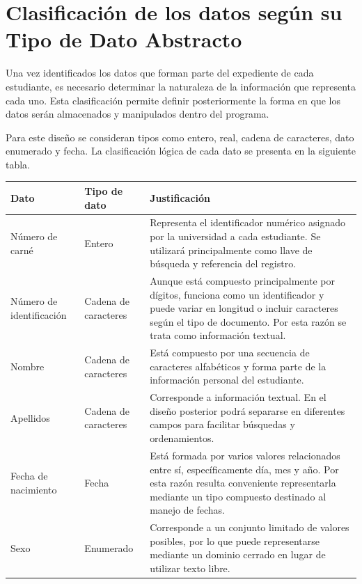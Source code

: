 \section{Clasificación de los datos según su Tipo de Dato Abstracto}

Una vez identificados los datos que forman parte del expediente de cada
estudiante, es necesario determinar la naturaleza de la información que
representa cada uno. Esta clasificación permite definir posteriormente
la forma en que los datos serán almacenados y manipulados dentro del
programa.

Para este diseño se consideran tipos como entero, real, cadena de
caracteres, dato enumerado y fecha. La clasificación lógica de cada dato
se presenta en la siguiente tabla.

\begin{longtable}{p{3.8cm} p{3.2cm} p{7cm}}
\toprule
Dato & Tipo de dato & Justificación \\
\midrule
\endhead

Número de carné &
Entero &
Representa el identificador numérico asignado por la universidad a cada
estudiante. Se utilizará principalmente como llave de búsqueda y
referencia del registro. \\

Número de identificación &
Cadena de caracteres &
Aunque está compuesto principalmente por dígitos, funciona como un
identificador y puede variar en longitud o incluir caracteres según el
tipo de documento. Por esta razón se trata como información textual. \\

Nombre &
Cadena de caracteres &
Está compuesto por una secuencia de caracteres alfabéticos y forma parte
de la información personal del estudiante. \\

Apellidos &
Cadena de caracteres &
Corresponde a información textual. En el diseño posterior podrá
separarse en diferentes campos para facilitar búsquedas y ordenamientos. \\

Fecha de nacimiento &
Fecha &
Está formada por varios valores relacionados entre sí, específicamente
día, mes y año. Por esta razón resulta conveniente representarla mediante
un tipo compuesto destinado al manejo de fechas. \\

Sexo &
Enumerado &
Corresponde a un conjunto limitado de valores posibles, por lo que puede
representarse mediante un dominio cerrado en lugar de utilizar texto
libre. \\


\end{longtable}
